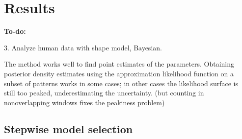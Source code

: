 \documentclass{article}
\theoremstyle{plain}
\theoremstyle{definition}
\begin{document}
\section{Results}

\textbf{To-do:} 

3. Analyze human data with shape model, Bayesian.

The method works well to find point estimates of the parameters.
Obtaining posterior density estimates using the approximation likelihood function on a subset of patterns
works in some cases;
in other cases the likelihood surface is still too peaked, underestimating the uncertainty.
(but counting in nonoverlapping windows fixes the peakiness problem)

\subsection{Stepwise model selection}
\end{document}
